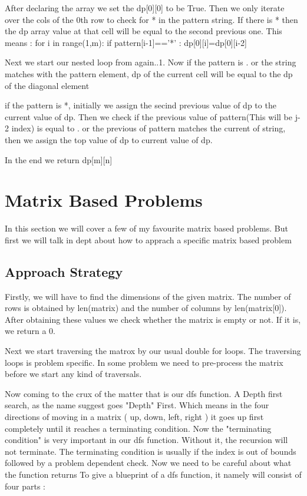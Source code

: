 \documentclass{article}
\newcommand{\nd}{\noindent}
\begin{document}
\nd After declaring the array we set the dp[0][0] to be True. Then we only iterate over the cols of the 0th row to check for * in the pattern string. If there is * then the dp array value at that cell will be equal to the second previous one. This means : for i in range(1,m): if pattern[i-1]=='*' : dp[0][i]=dp[0][i-2]  

\nd Next we start our nested loop from again..1. Now if the pattern is . or the string matches with the pattern element, dp of the current cell will be equal to the dp of the diagonal element 

\nd if the pattern is *, initially we assign the secind previous value of dp to the current value of dp. Then we check if the previous value of pattern(This will be j-2 index) is equal to . or the previous of pattern matches the current of string, then we assign the top value of dp to current value of dp. 

\nd In the end we return dp[m][n]
\section{ Matrix Based Problems } 
In this section we will cover a few of my favourite matrix based problems. But first we will talk in dept about how to apprach a specific matrix based problem 

\subsection {Approach Strategy}
Firstly, we will have to find the dimensions of the given matrix. The number of rows is obtained by len(matrix) and the number of columns by len(matrix[0]). After obtaining these values we check whether the matrix is empty or not. If it is, we return a 0. 

\nd Next we start traversing the matrox by our usual double for loops. The traversing loops is problem specific. In some problem we need to pre-process the matrix before we start any kind of traversals. 


\nd Now coming to the crux of the matter that is our dfs function. A Depth first search, as the name suggest goes "Depth" First. Which means in the four directions of moving in a matrix ( up, down, left, right ) it goes up first completely until it reaches a terminating condition. Now the "terminating condition" is very important in our dfs function. Without it, the recursion will not terminate.  The terminating condition is usually if the index is out of bounds followed by a problem dependent check. Now we need to be careful about what the function returns 
\newpage
\nd To give a blueprint of a dfs function, it namely will consist of four parts : 
\end{document}
